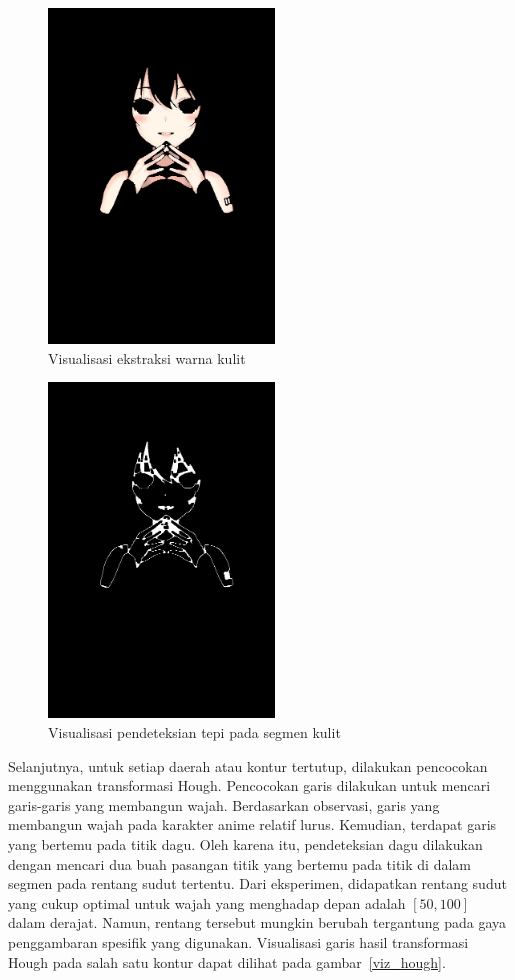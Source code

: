 \documentclass[conference, a4paper]{IEEEtran}
\begin{document}
\begin{figure}[ht]
  \begin{center}
    \includegraphics[width=6cm]{img/process_skin_threshold.jpg}
  \end{center}
  \caption{Visualisasi ekstraksi warna kulit}\label{skinsep}
\end{figure}
\begin{figure}[ht]
  \begin{center}
    \includegraphics[width=6cm]{img/process_skin_edges.jpg}
  \end{center}
  \caption{Visualisasi pendeteksian tepi pada segmen kulit}\label{skinedges}
\end{figure}

Selanjutnya, untuk setiap daerah atau kontur tertutup, dilakukan pencocokan menggunakan transformasi Hough. Pencocokan garis dilakukan untuk mencari garis-garis yang membangun wajah. Berdasarkan observasi, garis yang membangun wajah pada karakter anime relatif lurus. Kemudian, terdapat garis yang bertemu pada titik dagu. Oleh karena itu, pendeteksian dagu dilakukan dengan mencari dua buah pasangan titik yang bertemu pada titik di dalam segmen pada rentang sudut tertentu. Dari eksperimen, didapatkan rentang sudut yang cukup optimal untuk wajah yang menghadap depan adalah $[50, 100]$ dalam derajat. Namun, rentang tersebut mungkin berubah tergantung pada gaya penggambaran spesifik yang digunakan. Visualisasi garis hasil transformasi Hough pada salah satu kontur dapat dilihat pada gambar~\ref{viz_hough}.
\end{document}
